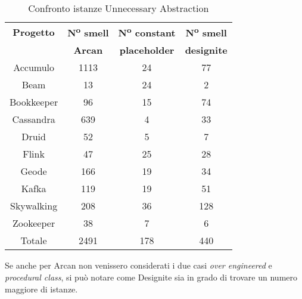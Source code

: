         \begin{table}[h]
            \centering
            \begin{tabular}{|c|c|c|c|}
                \hline
                \textbf{Progetto} & \textbf{N\textsuperscript{o} smell} & \textbf{N\textsuperscript{o} constant} & \textbf{N\textsuperscript{o} smell} \\
                & \textbf{Arcan} & \textbf{placeholder} & \textbf{designite}\\
                \hline
                Accumulo & 1113 & 24 & 77 \\
                Beam & 13 & 24 & 2\\
                Bookkeeper & 96 & 15 & 74\\
                Cassandra & 639 & 4 & 33\\
                Druid & 52 & 5 & 7\\
                Flink & 47 & 25 & 28\\
                Geode & 166 & 19 & 34\\
                Kafka & 119 & 19 & 51\\
                Skywalking & 208 & 36 & 128\\
                Zookeeper & 38 & 7 & 6\\
                \hline
                Totale & 2491 & 178 & 440 \\
                \hline
            \end{tabular}
            \caption{Confronto istanze Unnecessary Abstraction}
            \label{tab:caption}
        \end{table}
        Se anche per Arcan non venissero considerati i due casi \textit{over engineered} e \textit{procedural class}, si può notare come Designite sia in grado di trovare un numero maggiore di istanze. 
